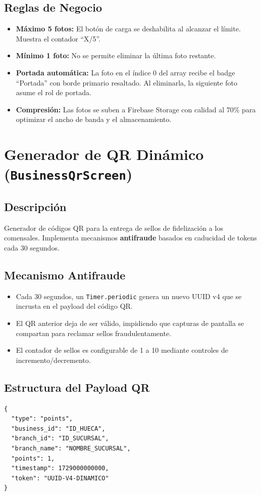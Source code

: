 \documentclass[11pt, a4paper, oneside]{report}
\begin{document}
\subsection{Reglas de Negocio}
\begin{itemize}
  \item \textbf{Máximo 5 fotos:} El botón de carga se deshabilita al alcanzar el límite. Muestra el contador ``X/5''.
  \item \textbf{Mínimo 1 foto:} No se permite eliminar la última foto restante.
  \item \textbf{Portada automática:} La foto en el índice 0 del array recibe el badge ``Portada'' con borde primario resaltado. Al eliminarla, la siguiente foto asume el rol de portada.
  \item \textbf{Compresión:} Las fotos se suben a Firebase Storage con calidad al 70\% para optimizar el ancho de banda y el almacenamiento.
\end{itemize}

\section{Generador de QR Dinámico (\texttt{BusinessQrScreen})}

\subsection{Descripción}
Generador de códigos QR para la entrega de sellos de fidelización a los comensales. Implementa mecanismos \textbf{antifraude} basados en caducidad de tokens cada 30 segundos.

\subsection{Mecanismo Antifraude}
\begin{itemize}
  \item Cada 30 segundos, un \texttt{Timer.periodic} genera un nuevo UUID v4 que se incrusta en el payload del código QR.
  \item El QR anterior deja de ser válido, impidiendo que capturas de pantalla se compartan para reclamar sellos fraudulentamente.
  \item El contador de sellos es configurable de 1 a 10 mediante controles de incremento/decremento.
\end{itemize}

\subsection{Estructura del Payload QR}
\begin{lstlisting}[style=dartcode]
{
  "type": "points",
  "business_id": "ID_HUECA",
  "branch_id": "ID_SUCURSAL",
  "branch_name": "NOMBRE_SUCURSAL",
  "points": 1,
  "timestamp": 1729000000000,
  "token": "UUID-V4-DINAMICO"
}
\end{lstlisting}
\end{document}
